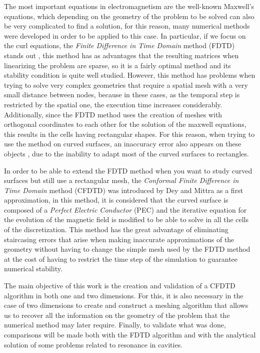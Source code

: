 \documentclass[12pt, oneside]{book}
\begin{document}
The most important equations in electromagnetism are the well-known Maxwell's equations, which depending on the geometry of the problem to be solved can also be very complicated to find a solution, for this reason, many numerical methods were developed in order to be applied to this case. In particular, if we focus on the curl equations, the \textit{Finite Difference in Time Domain} method (FDTD) stands out  \cite{Taflove2005}, this method has as advantages that the resulting matrices when linearizing the problem are sparse, so it is a fairly optimal method and its stability condition is quite well studied. However, this method has problems when trying to solve very complex geometries that require a spatial mesh with a very small distance between nodes, because in these cases, as the temporal step is restricted by the spatial one, the execution time increases considerably. Additionally, since the FDTD method uses the creation of meshes with orthogonal coordinates to each other for the solution of the maxwell equations, this results in the cells having rectangular shapes. For this reason, when trying to use the method on curved surfaces, an inaccuracy error also appears on these objects \cite{Dey1997ALC}, due to the inability to adapt most of the curved surfaces to rectangles.

In order to be able to extend the FDTD method when you want to study curved surfaces but still use a rectangular mesh, the \textit{Conformal Finite Difference in Time Domain} method (CFDTD) was introduced by Dey and Mittra \cite{DeyMittra1997} as a first approximation, in this method, it is considered that the curved surface is composed of a \textit{Perfect Electric Conductor} (PEC) and the iterative equation for the evolution of the magnetic field is modified to be able to solve in all the cells of the discretization. This method has the great advantage of eliminating staircasing errors that arise when making inaccurate approximations of the geometry \cite{Dey1997ALC} without having to change the simple mesh used by the FDTD method at the cost of having to restrict the time step of the simulation to guarantee numerical stability.

The main objective of this work is the creation and validation of a CFDTD algorithm in both one and two dimensions. For this, it is also necessary in the case of two dimensions to create and construct a meshing algorithm that allows us to recover all the information on the geometry of the problem that the numerical method may later require. Finally, to validate what was done, comparisons will be made both with the FDTD algorithm and with the analytical solution of some problems related to resonance in cavities.
\end{document}
